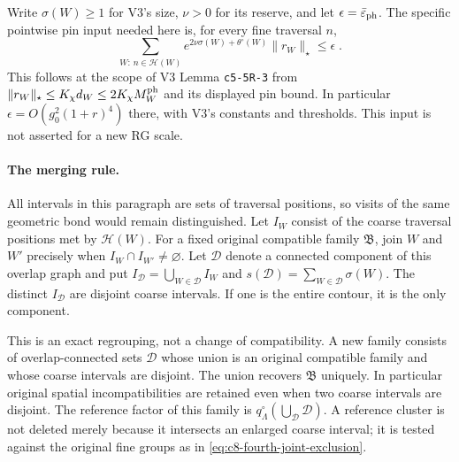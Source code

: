 \documentclass[11pt]{article}
\begin{document}
Write $\sigma(W)\geq1$ for V3's size, $\nu>0$ for its reserve,
and let $\epsilon=\bar\varepsilon_{\rm ph}$. The specific
pointwise pin input needed here is, for every fine traversal $n$,
\begin{equation}\label{eq:c8-fourth-fine-pin-input}
    \sum_{W:\,n\in\mathcal H(W)}
        e^{2\nu\sigma(W)+\theta^\circ(W)}
            \|r_W\|_\star\leq\epsilon\;.
\end{equation}
This follows at the scope of V3 Lemma
\texttt{c5-5R-3} from
$\|r_W\|_\star\leq K_\chi d_W\leq2K_\chi M_W^{\rm ph}$
and its displayed pin bound. In particular
$\epsilon=O(g_0^2(1+r)^4)$ there, with V3's constants and
thresholds. This input is not asserted for a new RG scale.

\paragraph{The merging rule.}
All intervals in this paragraph are sets of traversal positions,
so visits of the same geometric bond would remain distinguished.
Let $I_W$ consist of the coarse traversal positions met by
$\mathcal H(W)$. For a fixed original compatible family
$\mathfrak B$, join $W$ and $W'$ precisely when
$I_W\cap I_{W'}\neq\varnothing$. Let $\mathcal D$ denote a
connected component of this overlap graph and put
$I_{\mathcal D}=\bigcup_{W\in\mathcal D}I_W$ and
$s(\mathcal D)=\sum_{W\in\mathcal D}\sigma(W)$.
The distinct $I_{\mathcal D}$ are disjoint coarse intervals.
If one is the entire contour, it is the only component.

This is an exact regrouping, not a change of compatibility.
A new family consists of overlap-connected sets $\mathcal D$
whose union is an original compatible family and whose coarse
intervals are disjoint. The union recovers $\mathfrak B$
uniquely. In particular original spatial incompatibilities are
retained even when two coarse intervals are disjoint.
The reference factor of this family is
$q^\circ_\Lambda(\bigcup_{\mathcal D}\mathcal D)$.
A reference cluster is not deleted merely because it intersects
an enlarged coarse interval; it is tested against the original
fine groups as in \eqref{eq:c8-fourth-joint-exclusion}.
\end{document}
